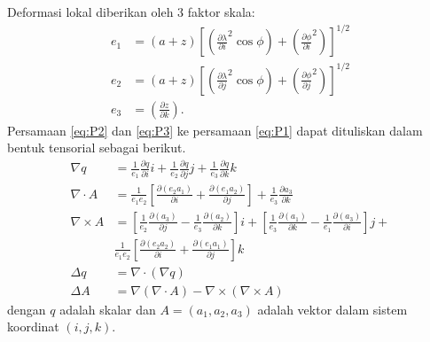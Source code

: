 \begin{spacing}{1.5}
	Deformasi lokal diberikan oleh 3 faktor skala:
	\begin{equation}\label{eq:scale}
		\begin{aligned}
			e_1 &= (a+z)\left[(\frac{\partial \lambda}{\partial i}^2\cos \phi)+(\frac{\partial \phi}{\partial i}^2)\right]^{1/2}\\
			e_2 &= (a+z)\left[(\frac{\partial \lambda}{\partial j}^2\cos \phi)+(\frac{\partial \phi}{\partial j}^2)\right]^{1/2}\\
			e_3 &=(\frac{\partial z}{\partial k}).
		\end{aligned}
	\end{equation}
	Persamaan \ref{eq:P2} dan \ref{eq:P3} ke persamaan \ref{eq:P1} dapat dituliskan dalam bentuk tensorial sebagai berikut.
	\begin{equation}\label{eq:tensor1}
		\begin{aligned}
			\nabla q &= \frac{1}{e_1}\frac{\partial q}{\partial i}i+\frac{1}{e_2}\frac{\partial q}{\partial j}j+\frac{1}{e_3}\frac{\partial q}{\partial k}k\\
			\nabla \cdot A &= \frac{1}{e_1e_2}\left[\frac{\partial (e_2a_1)}{\partial i}+\frac{\partial (e_1a_2)}{\partial  j}\right]+\frac{1}{e_3}\frac{\partial a_3}{\partial k}\\
			\nabla \times A &= \left[\frac{1}{e_2}\frac{\partial (a_3)}{\partial j}-\frac{1}{e_3}\frac{\partial (a_2)}{\partial  k}\right]i+\left[\frac{1}{e_3}\frac{\partial (a_1)}{\partial k}-\frac{1}{e_1}\frac{\partial (a_3)}{\partial i}\right]j+ \\
			& \frac{1}{e_1e_2}\left[\frac{\partial (e_2a_2)}{\partial i}+\frac{\partial (e_1a_1)}{\partial j}\right]k\\
			\Delta q &=\nabla \cdot (\nabla q)\\
			\Delta A &=\nabla(\nabla \cdot A)-\nabla \times (\nabla \times A)
		\end{aligned}
	\end{equation}
	dengan $q$ adalah skalar dan $A=(a_1,a_2,a_3)$ adalah vektor dalam sistem koordinat $(i,j,k)$.
	

\end{spacing}
